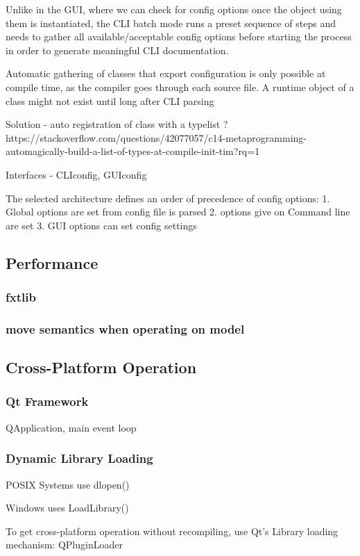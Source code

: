 Unlike in the GUI, where we can check for config options once the object using them is instantiated, the CLI batch mode runs a preset sequence of steps and needs to gather all available/acceptable config options before starting the process in order to generate meaningful CLI documentation.	

Automatic gathering of classes that export configuration is only possible at compile time, as the compiler goes through each source file. A runtime object of a class might not exist until long after CLI parsing	


Solution - auto registration of class with a typelist ?
https://stackoverflow.com/questions/42077057/c14-metaprogramming-automagically-build-a-list-of-types-at-compile-init-tim?rq=1

Interfaces - CLIconfig, GUIconfig

The selected architecture defines an order of precedence of config options:
1. Global options are set from config file is parsed
2. options give on Command line are set 
3. GUI options can set config settings

\subsection{Performance}
\subsubsection{fxtlib}
\subsubsection{move semantics when operating on model}

\subsection{Cross-Platform Operation}
\subsubsection{Qt Framework}
QApplication, main event loop

\subsubsection{Dynamic Library Loading}
POSIX Systems use dlopen()

Windows uses LoadLibrary()

To get cross-platform operation without recompiling, use Qt's Library loading mechanism: QPluginLoader

